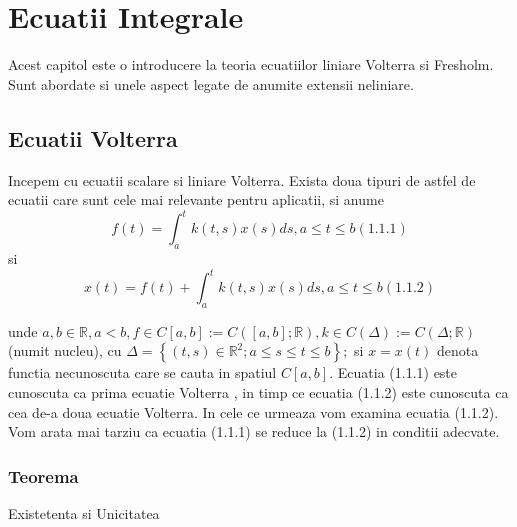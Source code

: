 \documentclass[a4paper,12pt,oneside]{report}
\begin{document}
\maketitle

\tableofcontents

%
%
%
%
\chapter{Ecuatii Integrale}

Acest capitol este o introducere la teoria ecuatiilor liniare Volterra si Fresholm. Sunt abordate si unele aspect legate de anumite extensii neliniare.

\section{Ecuatii Volterra}

Incepem cu ecuatii scalare si liniare Volterra. Exista doua tipuri de astfel de ecuatii care sunt cele mai relevante pentru aplicatii, si anume
\begin{displaymath}
  f\left ( t \right ) = \int_{a}^{t}k\left ( t,s \right )x\left ( s \right )ds,    a\leq t\leq b (1.1.1)
\end{displaymath}
si 
\begin{displaymath}
  x\left ( t \right ) = f\left ( t \right ) + \int_{a}^{t}k\left ( t,s \right )x\left ( s \right )ds, a\leq t\leq b (1.1.2)
\end{displaymath}

unde \(a,b \in \mathbb{R}, a< b, f\in C\left [ a,b \right ]:= C\left ( \left [ a,b \right ];\mathbb{R} \right ) , k\in C\left (\Delta   \right ):= C\left ( \Delta ;\mathbb{R} \right )\) (numit nucleu), cu \(\Delta =\left \{ \left ( t,s \right )\in \mathbb{R}^{2};a\leq s\leq t\leq b \right \};\) si \(x=x\left ( t \right )\) denota functia necunoscuta care se cauta in spatiul \(C\left [ a,b \right ]\). 
Ecuatia (1.1.1) este cunoscuta ca prima ecuatie Volterra , in timp ce ecuatia (1.1.2) este cunoscuta ca cea de-a doua ecuatie Volterra. In cele ce urmeaza vom examina ecuatia (1.1.2). Vom arata mai tarziu ca ecuatia (1.1.1) se reduce la (1.1.2) in conditii adecvate. 

\subsection{Teorema}

Existetenta si Unicitatea
\end{document}
